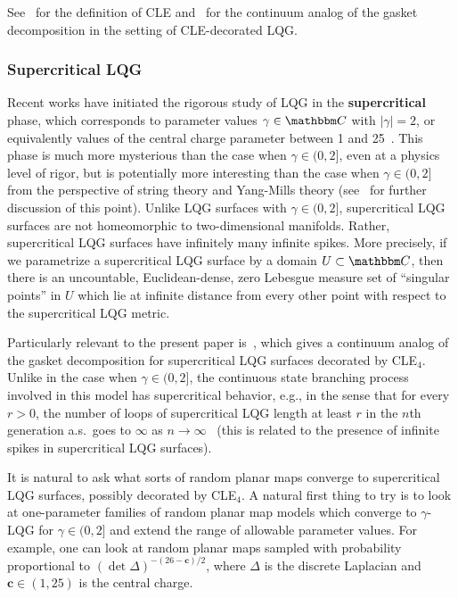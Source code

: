 \documentclass[11pt]{article}
\theoremstyle{plain}
\theoremstyle{definition}
\numberwithin{equation}{section}
\newcommand{\BB}{\mathbbm}
\newcommand{\cc}{{\mathbf{c}}}
\begin{document}
See~\cite{shef-cle} for the definition of CLE and~\cite{msw-non-simple-cle,msw-simple-cle-lqg} for the continuum analog of the gasket decomposition in the setting of CLE-decorated LQG. 
 
 
\subsubsection*{Supercritical LQG}

Recent works have initiated the rigorous study of LQG in the \textbf{supercritical} phase, which corresponds to parameter values $\gamma\in\BB C$ with $|\gamma|=2$, or equivalently values of the central charge parameter between 1 and 25~\cite{ghpr-central-charge,dg-supercritical-lfpp,pfeffer-supercritical-lqg,dg-uniqueness,ag-supercritical-cle4,bgs-supercritical-crt}. This phase is much more mysterious than the case when $\gamma\in (0,2]$, even at a physics level of rigor, but is potentially more interesting than the case when $\gamma\in (0,2]$ from the perspective of string theory and Yang-Mills theory (see~\cite[Remark 1.4]{ag-supercritical-cle4} for further discussion of this point). Unlike LQG surfaces with $\gamma \in (0,2]$, supercritical LQG surfaces are not homeomorphic to two-dimensional manifolds. Rather, supercritical LQG surfaces have infinitely many infinite spikes. More precisely, if we parametrize a supercritical LQG surface by a domain $U\subset\BB C$, then there is an uncountable, Euclidean-dense, zero Lebesgue measure set of ``singular points'' in $U$ which lie at infinite distance from every other point with respect to the supercritical LQG metric.  

Particularly relevant to the present paper is~\cite{ag-supercritical-cle4}, which gives a continuum analog of the gasket decomposition for supercritical LQG surfaces decorated by CLE$_4$. Unlike in the case when $\gamma \in (0,2]$, the continuous state branching process involved in this model has supercritical behavior, e.g., in the sense that for every $r > 0$, the number of loops of supercritical LQG length at least $r$ in the $n$th generation a.s.\ goes to $\infty$ as $n\to\infty$~\cite[Proposition 3.1]{bgs-supercritical-crt} (this is related to the presence of infinite spikes in supercritical LQG surfaces). 

It is natural to ask what sorts of random planar maps converge to supercritical LQG surfaces, possibly decorated by CLE$_4$. A natural first thing to try is to look at one-parameter families of random planar map models which converge to $\gamma$-LQG for $\gamma\in (0,2]$ and extend the range of allowable parameter values.
For example, one can look at random planar maps sampled with probability proportional to $(\det \Delta)^{-(26-\cc )/2}$, where $\Delta$ is the discrete Laplacian and $\cc\in (1,25)$ is the central charge.
\end{document}
